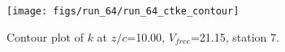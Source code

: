 \begin{figure}[H]
\centering
\texttt{[image: figs/run\_64/run\_64\_ctke\_contour]}
\caption{Contour plot of $k$ at $z/c$=10.00, $V_{free}$=21.15, station 7.}
\end{figure}


